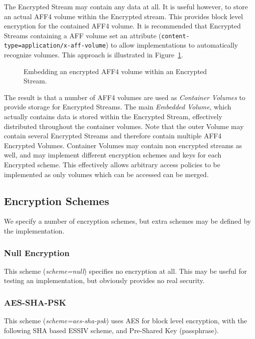 \documentclass[10pt, conference]{IEEEtran}
\begin{document}
The Encrypted Stream may contain any data at all. It is useful
however, to store an actual AFF4 volume within the Encrypted
stream. This provides block level encryption for the contained AFF4
volume. It is recommended that Encrypted Streams containing a AFF
volume set an attribute (\texttt{content-type=application/x-aff-volume})
to allow implementations to automatically recognize volumes. This
approach is illustrated in Figure~\ref{crypted_fif}.

\begin{figure}[tb]
  \begin{center}
  \mbox{\columnwidth {}}
  \caption{Embedding an encrypted AFF4 volume within an Encrypted Stream.}
  \label{crypted_fif}
  \end{center}
\end{figure}

The result is that a number of AFF4 volumes are used as {\em Container
Volumes} to provide storage for Encrypted Streams. The main {\em
Embedded Volume}, which actually contains data is stored within the
Encrypted Stream, effectively distributed throughout the container
volumes. Note that the outer Volume may contain several Encrypted
Streams and therefore contain multiple AFF4 Encrypted 
Volumes. Container Volumes may contain non encrypted streams as well,
and may implement different encryption schemes and keys for each
Encrypted scheme. This effectively allows arbitrary access policies to
be implemented as only volumes which can be accessed can be merged.

\subsection{Encryption Schemes}
We specify a number of encryption schemes, but extra schemes may be
defined by the implementation.

\subsubsection{Null Encryption}
This scheme ({\em scheme=null}) specifies no encryption at all. This
may be useful for testing an implementation, but obviously provides
no real security.

\subsubsection{AES-SHA-PSK}
This scheme ({\em scheme=aes-sha-psk}) uses AES for block level
encryption, with the following SHA based ESSIV scheme, and Pre-Shared
Key (passphrase).
\end{document}
